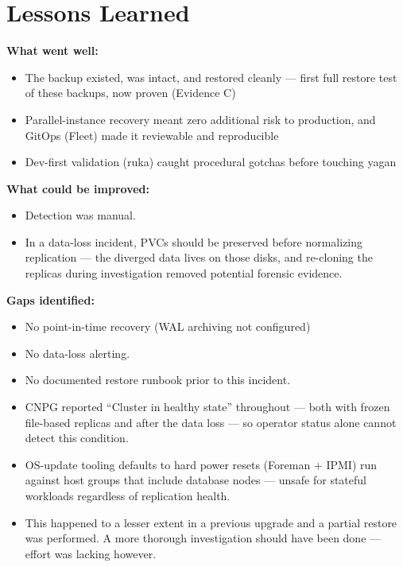 \documentclass[PMO,authoryear,toc]{lsstdoc}
\begin{document}
\section{Lessons Learned}

\textbf{What went well:}

\begin{itemize}
  \item The backup existed, was intact, and restored cleanly --- first full
        restore test of these backups, now proven (Evidence C)
  \item Parallel-instance recovery meant zero additional risk to production,
        and GitOps (Fleet) made it reviewable and reproducible
  \item Dev-first validation (ruka) caught procedural gotchas before touching
        yagan
\end{itemize}

\textbf{What could be improved:}

\begin{itemize}
  \item Detection was manual.
  \item In a data-loss incident, PVCs should be preserved before normalizing
        replication --- the diverged data lives on those disks, and re-cloning
        the replicas during investigation removed potential forensic evidence.
\end{itemize}

\textbf{Gaps identified:}

\begin{itemize}
  \item No point-in-time recovery (WAL archiving not configured)
  \item No data-loss alerting.
  \item No documented restore runbook prior to this incident.
  \item CNPG reported ``Cluster in healthy state'' throughout --- both with
        frozen file-based replicas and after the data loss --- so operator
        status alone cannot detect this condition.
  \item OS-update tooling defaults to hard power resets (Foreman + IPMI) run
        against host groups that include database nodes --- unsafe for
        stateful workloads regardless of replication health.
  \item This happened to a lesser extent in a previous upgrade and a partial
        restore was performed. A more thorough investigation should have been
        done --- effort was lacking however.
\end{itemize}
\end{document}

